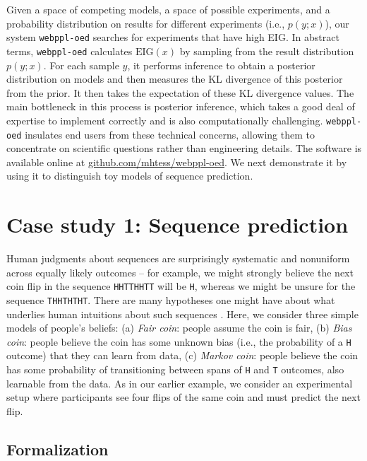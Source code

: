 \documentclass[10pt,letterpaper]{article}
\newcommand{\ndg}[1]{\textcolor{Green}{[ndg: #1]}}
\begin{document}
Given a space of competing models, a space of possible experiments, and a probability distribution on results for different experiments (i.e., $p(y; x)$), our system \texttt{webppl-oed} searches for experiments that have high EIG.
In abstract terms, \texttt{webppl-oed} calculates $\mathrm{EIG}(x)$ by sampling from the result distribution $p(y; x)$.
For each sample $y$, it performs inference to obtain a posterior distribution on models and then measures the KL divergence of this posterior from the prior.
It then takes the expectation of these KL divergence values.
The main bottleneck in this process is posterior inference, which takes a good deal of expertise to implement correctly and is also computationally challenging.
\texttt{webppl-oed} insulates end users from these technical concerns, allowing them to concentrate on scientific questions rather than engineering details.
The software is available online at \break\url{github.com/mhtess/webppl-oed}.
We next demonstrate it by using it to distinguish toy models of sequence prediction.

\section{Case study 1: Sequence prediction}
\label{s:tutorial}

Human judgments about sequences are surprisingly systematic and nonuniform across equally likely outcomes -- for example, we might strongly believe the next coin flip in the sequence \lstinline{HHTTHHTT} will be \lstinline{H}, whereas we might be unsure for the sequence \lstinline{THHTHTHT}.
There are many hypotheses one might have about what underlies human intuitions about such sequences \citep{goodfellow38:jep, falk81:pme, Griffiths2004_nips}.
Here, we consider three simple models of people's beliefs: (a) \emph{Fair coin}: people assume the coin is fair, (b) \emph{Bias coin}: people believe the coin has some unknown bias (i.e., the probability of a \lstinline{H} outcome) that they can learn from data, (c) \emph{Markov coin}: people believe the coin has some probability of transitioning between spans of \lstinline{H} and \lstinline{T} outcomes, also learnable from the data.
As in our earlier example, we consider an experimental setup where participants see four flips of the same coin and must predict the next flip.

\subsection{Formalization}
\end{document}
